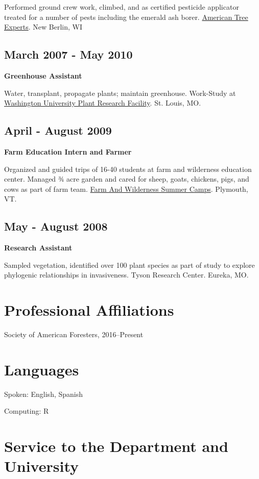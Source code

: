\documentclass{article}
\begin{document}
Performed ground crew work, climbed, and as certified pesticide
applicator treated for a number of pests including the emerald ash
borer. \href{http://atetreecare.com/}{American Tree Experts}.  New Berlin, WI

\subsection*{March 2007 - May 2010}
\label{sec:org9ec010a}
\textbf{Greenhouse Assistant}

Water, transplant, propagate plants; maintain greenhouse. Work-Study
at \href{http://biology4.wustl.edu/greenhouse/index.html}{Washington University Plant Research Facility}. St. Louis, MO.

\subsection*{April - August 2009}
\label{sec:orged65298}
\textbf{Farm Education Intern and Farmer}

Organized and guided trips of 16-40 students at farm and wilderness
education center. Managed 3⁄4 acre garden and cared for sheep, goats,
chickens, pigs, and cows as part of farm team.  \href{https://farmandwilderness.org/}{Farm And Wilderness
Summer Camps}. Plymouth, VT.

\subsection*{May - August 2008}
\label{sec:orgc531f43}
\textbf{Research Assistant}

Sampled vegetation, identified over 100 plant species as part of study
to explore phylogenic relationships in invasiveness.  Tyson Research
Center. Eureka, MO.
\section*{Professional Affiliations}
\label{sec:orgdf43d36}
Society of American Foresters, 2016--Present

\section*{Languages}
\label{sec:org4a01012}
Spoken: English, Spanish

Computing: R

\section*{Service to the Department and University}
\label{sec:orga01774b}
\end{document}
